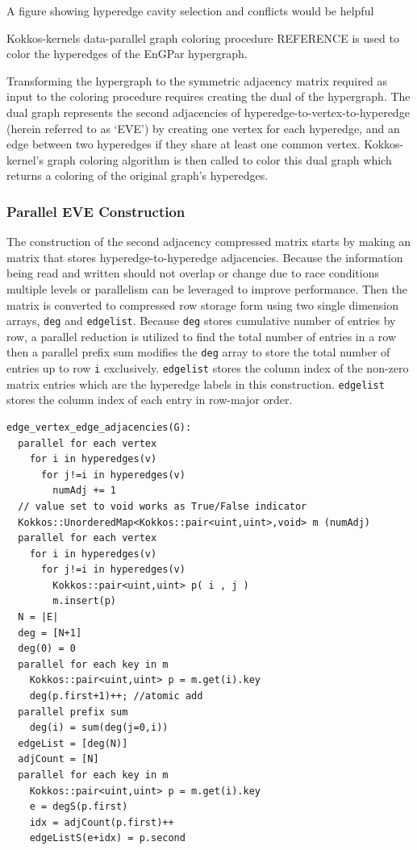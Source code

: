 \documentclass[graybox]{svmult}
\begin{document}
{\color{red}A figure showing hyperedge cavity selection and conflicts would be
helpful}

Kokkos-kernels data-parallel graph coloring procedure REFERENCE is used to
color the hyperedges of the EnGPar hypergraph.

Transforming the hypergraph to the symmetric adjacency matrix required as input
to the coloring procedure requires creating the dual of the hypergraph.
The dual graph represents the second adjacencies of
hyperedge-to-vertex-to-hyperedge (herein referred to as `EVE') by creating one
vertex for each hyperedge, and an edge between two hyperedges if they share at
least one common vertex.
Kokkos-kernel's graph coloring algorithm is then called to color this dual graph
which returns a coloring of the original graph's hyperedges.

\subsubsection{Parallel EVE Construction}

The construction of the second adjacency compressed matrix starts by making an
matrix that stores hyperedge-to-hyperedge adjacencies.
Because the information being read and written should not overlap or change due
to race conditions multiple levels or parallelism can be leveraged to improve
performance.
Then the matrix is converted to compressed row storage form using two single
dimension arrays, \verb|deg| and \verb|edgelist|.
Because \verb|deg| stores cumulative number of entries by row, a parallel
reduction is utilized to find the total number of entries in a row then a
parallel prefix sum  modifies the \verb|deg| array to store the total number of
entries up to row \verb|i| exclusively.
\verb|edgelist| stores the column index of the non-zero matrix entries which are
the hyperedge labels in this construction.
\verb|edgelist| stores the column index of each entry in row-major order.

\begin{verbatim}
edge_vertex_edge_adjacencies(G):
  parallel for each vertex
    for i in hyperedges(v)
      for j!=i in hyperedges(v)
        numAdj += 1 
  // value set to void works as True/False indicator
  Kokkos::UnorderedMap<Kokkos::pair<uint,uint>,void> m (numAdj)
  parallel for each vertex
    for i in hyperedges(v)
      for j!=i in hyperedges(v)
        Kokkos::pair<uint,uint> p( i , j )
        m.insert(p)       
  N = |E|
  deg = [N+1]
  deg(0) = 0
  parallel for each key in m
    Kokkos::pair<uint,uint> p = m.get(i).key 
    deg(p.first+1)++; //atomic add    
  parallel prefix sum 
    deg(i) = sum(deg(j=0,i))  
  edgeList = [deg(N)]
  adjCount = [N]
  parallel for each key in m
    Kokkos::pair<uint,uint> p = m.get(i).key
    e = degS(p.first)
    idx = adjCount(p.first)++
    edgeListS(e+idx) = p.second
\end{verbatim}
\end{document}
